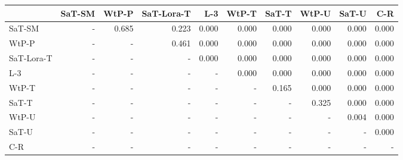 \begin{tabular}{lrrrrrrrrr}
\toprule
 & SaT-SM & WtP-P & SaT-Lora-T & L-3 & WtP-T & SaT-T & WtP-U & SaT-U & C-R \\
\midrule
SaT-SM & - & 0.685 & 0.223 & 0.000 & 0.000 & 0.000 & 0.000 & 0.000 & 0.000 \\
WtP-P & - & - & 0.461 & 0.000 & 0.000 & 0.000 & 0.000 & 0.000 & 0.000 \\
SaT-Lora-T & - & - & - & 0.000 & 0.000 & 0.000 & 0.000 & 0.000 & 0.000 \\
L-3 & - & - & - & - & 0.000 & 0.000 & 0.000 & 0.000 & 0.000 \\
WtP-T & - & - & - & - & - & 0.165 & 0.000 & 0.000 & 0.000 \\
SaT-T & - & - & - & - & - & - & 0.325 & 0.000 & 0.000 \\
WtP-U & - & - & - & - & - & - & - & 0.004 & 0.000 \\
SaT-U & - & - & - & - & - & - & - & - & 0.000 \\
C-R & - & - & - & - & - & - & - & - & - \\
\bottomrule
\end{tabular}

